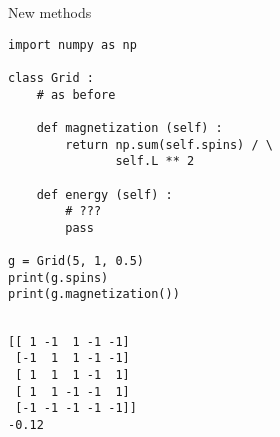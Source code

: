 
\begin{frame}[fragile]{New methods}
%
\begin{tcbraster}[raster columns=2,
                  raster equal height,
                  nobeforeafter,
                  raster column skip=0.5cm]
\begin{codebox}
\begin{verbatim}
import numpy as np

class Grid :
    # as before
    
    def magnetization (self) :
        return np.sum(self.spins) / \
               self.L ** 2
    
    def energy (self) :
        # ???
        pass

g = Grid(5, 1, 0.5)
print(g.spins)
print(g.magnetization())
\end{verbatim}
\end{codebox}
%
\begin{cmdbox}[Output]
\begin{verbatim}

[[ 1 -1  1 -1 -1]
 [-1  1  1 -1 -1]
 [ 1  1  1 -1  1]
 [ 1  1 -1 -1  1]
 [-1 -1 -1 -1 -1]]
-0.12
\end{verbatim}
\end{cmdbox}
\end{tcbraster}
%
\end{frame}


